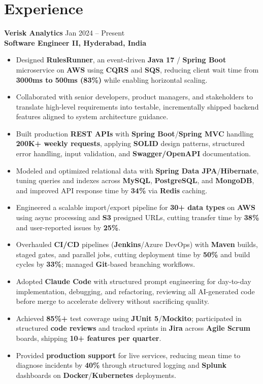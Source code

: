 \documentclass[a4paper,10pt]{article}
\begin{document}
\section*{Experience}

\textbf{Verisk Analytics} \hfill Jan 2024 -- Present \\
\textbf{Software Engineer II, Hyderabad, India}

\begin{itemize}[leftmargin=*]
    \item Designed \textbf{RulesRunner}, an event-driven \textbf{Java 17} / \textbf{Spring Boot} microservice on \textbf{AWS} using \textbf{CQRS} and \textbf{SQS}, reducing client wait time from \textbf{3000ms to 500ms (83\%)} while enabling horizontal scaling.
    \item Collaborated with senior developers, product managers, and stakeholders to translate high-level requirements into testable, incrementally shipped backend features aligned to system architecture guidance.
    \item Built production \textbf{REST APIs} with \textbf{Spring Boot}/\textbf{Spring MVC} handling \textbf{200K+ weekly requests}, applying \textbf{SOLID} design patterns, structured error handling, input validation, and \textbf{Swagger/OpenAPI} documentation.
    \item Modeled and optimized relational data with \textbf{Spring Data JPA}/\textbf{Hibernate}, tuning queries and indexes across \textbf{MySQL}, \textbf{PostgreSQL}, and \textbf{MongoDB}, and improved API response time by \textbf{34\%} via \textbf{Redis} caching.
    \item Engineered a scalable import/export pipeline for \textbf{30+ data types} on \textbf{AWS} using async processing and \textbf{S3} presigned URLs, cutting transfer time by \textbf{38\%} and user-reported issues by \textbf{25\%}.
    \item Overhauled \textbf{CI/CD} pipelines (\textbf{Jenkins}/Azure DevOps) with \textbf{Maven} builds, staged gates, and parallel jobs, cutting deployment time by \textbf{50\%} and build cycles by \textbf{33\%}; managed \textbf{Git}-based branching workflows.
    \item Adopted \textbf{Claude Code} with structured prompt engineering for day-to-day implementation, debugging, and refactoring, reviewing all AI-generated code before merge to accelerate delivery without sacrificing quality.
    \item Achieved \textbf{85\%+} test coverage using \textbf{JUnit 5}/\textbf{Mockito}; participated in structured \textbf{code reviews} and tracked sprints in \textbf{Jira} across \textbf{Agile Scrum} boards, shipping \textbf{10+ features per quarter}.
    \item Provided \textbf{production support} for live services, reducing mean time to diagnose incidents by \textbf{40\%} through structured logging and \textbf{Splunk} dashboards on \textbf{Docker}/\textbf{Kubernetes} deployments.
\end{itemize}
\end{document}
